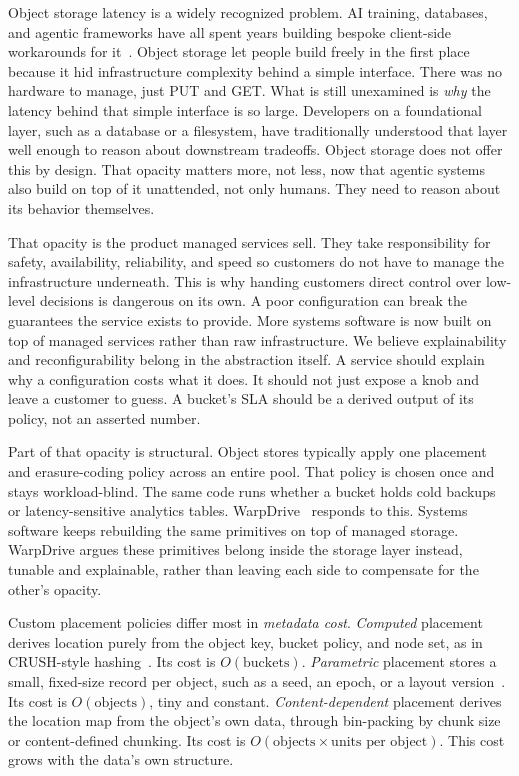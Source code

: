 \documentclass[10pt,conference]{IEEEtran}
\begin{document}
Object storage latency is a widely recognized problem. AI training,
databases, and agentic frameworks have all spent years building bespoke
client-side workarounds for it~\cite{warpdrive2026}. Object storage let
people build freely in the first place because it hid infrastructure
complexity behind a simple interface. There was no hardware to manage,
just PUT and GET. What is still unexamined is \emph{why} the latency
behind that simple interface is so large. Developers on a foundational
layer, such as a database or a filesystem, have traditionally understood
that layer well enough to reason about downstream tradeoffs. Object
storage does not offer this by design. That opacity matters more, not
less, now that agentic systems also build on top of it unattended, not
only humans. They need to reason about its behavior themselves.

That opacity is the product managed services sell. They take
responsibility for safety, availability, reliability, and speed so
customers do not have to manage the infrastructure underneath. This is why
handing customers direct control over low-level decisions is dangerous on
its own. A poor configuration can break the guarantees the service exists
to provide. More systems software is now built on top of managed services
rather than raw infrastructure. We believe explainability and
reconfigurability belong in the abstraction itself. A service should
explain why a configuration costs what it does. It should not just expose
a knob and leave a customer to guess. A bucket's SLA should be a derived
output of its policy, not an asserted number.

Part of that opacity is structural. Object stores typically apply one
placement and erasure-coding policy across an entire pool. That policy is
chosen once and stays workload-blind. The same code runs whether a bucket
holds cold backups or latency-sensitive analytics tables.
WarpDrive~\cite{warpdrive2026} responds to this. Systems software keeps
rebuilding the same primitives on top of managed storage. WarpDrive argues
these primitives belong inside the storage layer instead, tunable and
explainable, rather than leaving each side to compensate for the other's
opacity.

Custom placement policies differ most in \emph{metadata cost}.
\emph{Computed} placement derives location purely from the object key,
bucket policy, and node set, as in CRUSH-style hashing~\cite{crush2006}.
Its cost is $O(\text{buckets})$. \emph{Parametric} placement stores a
small, fixed-size record per object, such as a seed, an epoch, or a layout
version~\cite{mapx2020}. Its cost is $O(\text{objects})$, tiny and
constant. \emph{Content-dependent} placement derives the location map from
the object's own data, through bin-packing by chunk size or
content-defined chunking. Its cost is
$O(\text{objects} \times \text{units per object})$. This cost grows with
the data's own structure.
\end{document}
